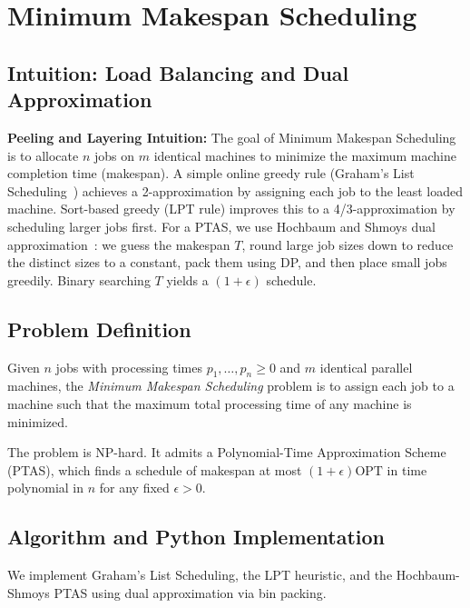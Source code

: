 \chapter{Minimum Makespan Scheduling}
\label{ch:makespan}

\section{Intuition: Load Balancing and Dual Approximation}

\begin{intuitionbox}
\textbf{Peeling and Layering Intuition:} The goal of Minimum Makespan Scheduling is to allocate $n$ jobs on $m$ identical machines to minimize the maximum machine completion time (makespan). A simple online greedy rule (Graham's List Scheduling~\cite{graham66}) achieves a 2-approximation by assigning each job to the least loaded machine. Sort-based greedy (LPT rule) improves this to a 4/3-approximation by scheduling larger jobs first. For a PTAS, we use Hochbaum and Shmoys dual approximation~\cite{hochbaum-shmoys87}: we guess the makespan $T$, round large job sizes down to reduce the distinct sizes to a constant, pack them using DP, and then place small jobs greedily. Binary searching $T$ yields a $(1+\epsilon)$ schedule.
\end{intuitionbox}

\section{Problem Definition}
Given $n$ jobs with processing times $p_1, \dots, p_n \ge 0$ and $m$ identical parallel machines, the \emph{Minimum Makespan Scheduling} problem is to assign each job to a machine such that the maximum total processing time of any machine is minimized.

The problem is NP-hard. It admits a Polynomial-Time Approximation Scheme (PTAS), which finds a schedule of makespan at most $(1 + \epsilon)\text{OPT}$ in time polynomial in $n$ for any fixed $\epsilon > 0$.

\section{Algorithm and Python Implementation}
We implement Graham's List Scheduling, the LPT heuristic, and the Hochbaum-Shmoys PTAS using dual approximation via bin packing.

